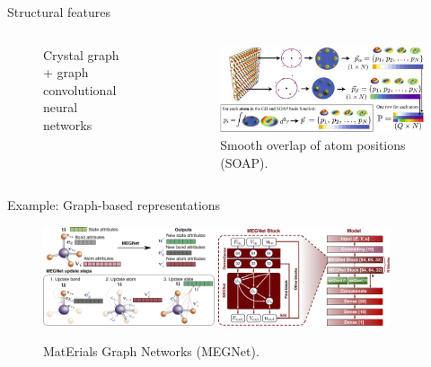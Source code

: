 \documentclass[aspectratio=169]{beamer}
\begin{document}
\begin{frame}{Structural features}
\begin{columns}
\begin{figure}
                \caption{Crystal graph + graph convolutional neural networks}
            \end{figure}
            \begin{figure}
                \centering
                \includegraphics[width=\textwidth]{figures/soap.png}
                \caption{Smooth overlap of atom positions (SOAP).\cite{rosenbrockDiscoveringBuildingBlocks2017}}
            \end{figure}
        \end{columns}
    \end{frame}


    \begin{frame}{Example: Graph-based representations}
        \begin{figure}
            \centering
            \includegraphics[width=0.45\textwidth]{figures/model_diagram.png}
            \includegraphics[width=0.45\textwidth]{figures/model_arch.jpg}
            \caption{MatErials Graph Networks (MEGNet).\cite{chenGraphNetworksUniversal2019}}
        \end{figure}
    \end{frame}
\end{document}
